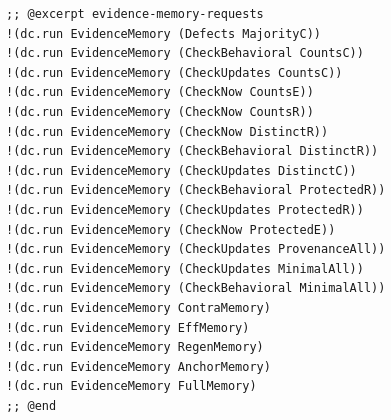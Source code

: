 \documentclass[11pt]{article}
\theoremstyle{definition}
\theoremstyle{plain}
\begin{document}
\begin{lstlisting}[style=mettafull]
;; @excerpt evidence-memory-requests
!(dc.run EvidenceMemory (Defects MajorityC))
!(dc.run EvidenceMemory (CheckBehavioral CountsC))
!(dc.run EvidenceMemory (CheckUpdates CountsC))
!(dc.run EvidenceMemory (CheckNow CountsE))
!(dc.run EvidenceMemory (CheckNow CountsR))
!(dc.run EvidenceMemory (CheckNow DistinctR))
!(dc.run EvidenceMemory (CheckBehavioral DistinctR))
!(dc.run EvidenceMemory (CheckUpdates DistinctC))
!(dc.run EvidenceMemory (CheckBehavioral ProtectedR))
!(dc.run EvidenceMemory (CheckUpdates ProtectedR))
!(dc.run EvidenceMemory (CheckNow ProtectedE))
!(dc.run EvidenceMemory (CheckUpdates ProvenanceAll))
!(dc.run EvidenceMemory (CheckUpdates MinimalAll))
!(dc.run EvidenceMemory (CheckBehavioral MinimalAll))
!(dc.run EvidenceMemory ContraMemory)
!(dc.run EvidenceMemory EffMemory)
!(dc.run EvidenceMemory RegenMemory)
!(dc.run EvidenceMemory AnchorMemory)
!(dc.run EvidenceMemory FullMemory)
;; @end


\end{lstlisting}
\end{document}
